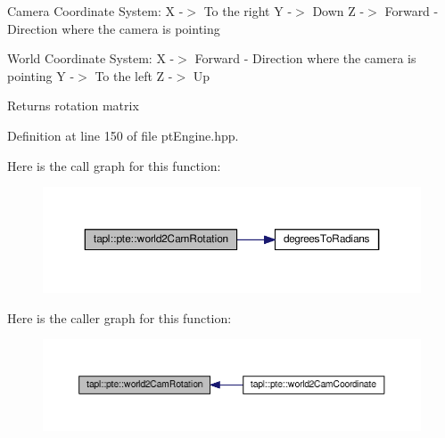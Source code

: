 Camera Coordinate System\+: X -\/$>$ To the right Y -\/$>$ Down Z -\/$>$ Forward -\/ Direction where the camera is pointing

World Coordinate System\+: X -\/$>$ Forward -\/ Direction where the camera is pointing Y -\/$>$ To the left Z -\/$>$ Up \begin{DoxyReturn}{Returns}
rotation matrix 
\end{DoxyReturn}


Definition at line 150 of file pt\+Engine.\+hpp.



Here is the call graph for this function\+:\nopagebreak
\begin{figure}[H]
\begin{center}
\leavevmode
\includegraphics[width=350pt]{namespacetapl_1_1pte_a874efe99ea9c6366ae0c0329554ad200_cgraph}
\end{center}
\end{figure}




Here is the caller graph for this function\+:\nopagebreak
\begin{figure}[H]
\begin{center}
\leavevmode
\includegraphics[width=350pt]{namespacetapl_1_1pte_a874efe99ea9c6366ae0c0329554ad200_icgraph}
\end{center}
\end{figure}


